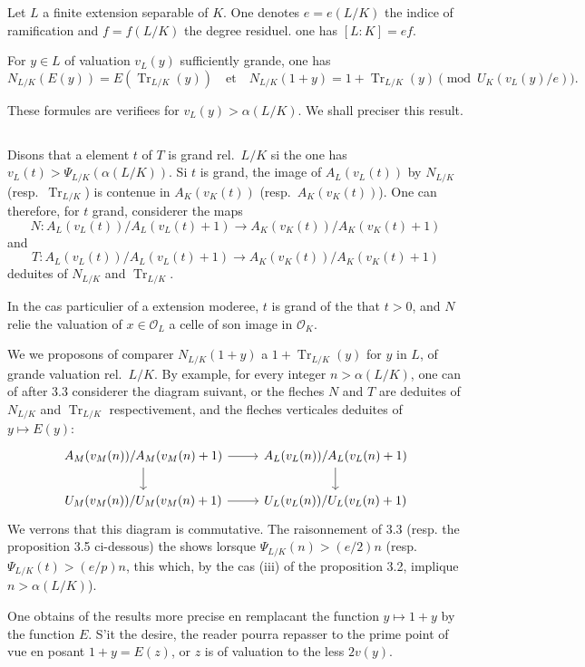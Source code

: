 \documentclass[12pt,a4paper]{article}
\theoremstyle{plain}
\theoremstyle{definition}
\theoremstyle{remark}
\DeclareMathOperator{\Tr}{Tr}
\newcommand{\cO}{\mathcal{O}}
\providecommand{\cO}{\mathcal{O}}
\providecommand{\Tr}{\operatorname{Tr}}
\begin{document}
Let $L$ a finite extension separable of $K$. One denotes $e = e(L/K)$ the indice of ramification and $f = f(L/K)$ the degree residuel. one has $[L:K] = ef$.

For $y \in L$ of valuation $v_L(y)$ sufficiently grande, one has
\[
N_{L/K}(E(y)) = E(\Tr_{L/K}(y)) \quad \text{et} \quad N_{L/K}(1+y) = 1 + \Tr_{L/K}(y) \pmod{U_K(v_L(y)/e)}.
\]

These formules are verifiees for $v_L(y) > \alpha(L/K)$. We shall preciser this result.

\subsection{}
\label{sec:3.4}

Disons that a element $t$ of $T$ is grand rel.~$L/K$ si the one has $v_L(t) > \Psi_{L/K}(\alpha(L/K))$. Si $t$ is grand, the image of $A_L(v_L(t))$ by $N_{L/K}$ (resp.~$\Tr_{L/K}$) is contenue in $A_K(v_K(t))$ (resp.~$A_K(v_K(t))$). One can therefore, for $t$ grand, considerer the maps
\[
N: A_L(v_L(t))/A_L(v_L(t)+1) \to A_K(v_K(t))/A_K(v_K(t)+1)
\]
and
\[
T: A_L(v_L(t))/A_L(v_L(t)+1) \to A_K(v_K(t))/A_K(v_K(t)+1)
\]
deduites of $N_{L/K}$ and $\Tr_{L/K}$.

In the cas particulier of a extension moderee, $t$ is grand of the that $t > 0$, and $N$ relie the valuation of $x \in \cO_L$ a celle of son image in $\cO_K$.

We we proposons of comparer $N_{L/K}(1+y)$ a $1 + \Tr_{L/K}(y)$ for $y$ in $L$, of grande valuation rel.~$L/K$. By example, for every integer $n > \alpha(L/K)$, one can of after 3.3 considerer the diagram suivant, or the fleches $N$ and $T$ are deduites of $N_{L/K}$ and $\Tr_{L/K}$ respectivement, and the fleches verticales deduites of $y \mapsto E(y)$:
\begin{equation}\label{eq:3.4.1}
\begin{tikzcd}
A_M(v_M(n))/A_M(v_M(n)+1) \arrow[r] \arrow[d] & A_L(v_L(n))/A_L(v_L(n)+1) \arrow[d] \\
U_M(v_M(n))/U_M(v_M(n)+1) \arrow[r] & U_L(v_L(n))/U_L(v_L(n)+1)
\end{tikzcd}
\end{equation}
We verrons that this diagram is commutative. The raisonnement of 3.3 (resp. the proposition 3.5 ci-dessous) the shows lorsque $\Psi_{L/K}(n) > (e/2)n$ (resp. $\Psi_{L/K}(t) > (e/p)n$, this which, by the cas (iii) of the proposition 3.2, implique $n > \alpha(L/K)$).

One obtains of the results more precise en remplacant the function $y \mapsto 1+y$ by the function $E$. S'it the desire, the reader pourra repasser to the prime point of vue en posant $1+y = E(z)$, or $z$ is of valuation to the less $2v(y)$.
\end{document}
